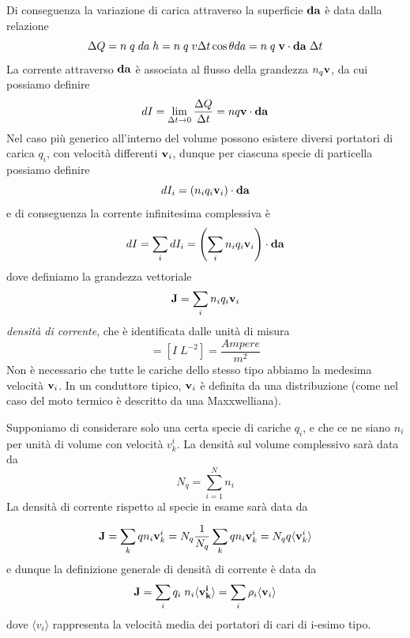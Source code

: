 Di conseguenza la variazione di carica attraverso la superficie $\bold{da}$ \`e data dalla relazione 
\begin{equation*}
	\Delta Q = n \;q\; da \; h = n\; q \;v \Delta t \cos \theta da = n \;q \; \bold{v} \cdot \bold{da} \; \Delta t 
\end{equation*}
La corrente attraverso $\bold{da}$ \`e associata al flusso della grandezza $n_q \bold{v}$, da cui possiamo definire 
\begin{equation*}
	dI = \lim_{\Delta t \to 0} \frac{\Delta Q}{\Delta t} = nq \bold{v} \cdot \bold{da} 
\end{equation*}
Nel caso pi\`u generico all'interno del volume possono esistere diversi portatori di carica $q_i$, con velocit\`a differenti $\bold{v}_i$, dunque per ciascuna specie di particella possiamo definire 
\begin{equation*}
	dI_i = (n_iq_i\bold{v}_i)\cdot \bold{da}
\end{equation*}
e di conseguenza la corrente infinitesima complessiva \`e 
\begin{equation*}
	dI = \sum_{i}dI_i = \left (\sum_{i}n_i q_i \bold{v}_i \right) \cdot \bold{da}
\end{equation*}
dove definiamo la grandezza vettoriale
\begin{equation*}
	\bold{J}= \sum_{i}n_i q_i \bold{v}_i 
\end{equation*}
\textit{densit\`a di corrente}, che \`e identificata dalle unit\`a di misura 
\begin{equation*}
	[\bold{J}] = [I \; L^{-2}] = \frac{Ampere}{m^2}
\end{equation*}
Non \`e necessario che tutte le cariche dello stesso tipo abbiamo la medesima velocit\`a $\bold{v}_i$. In un conduttore tipico, $\bold{v}_i$ \`e definita da una distribuzione (come nel caso del moto termico \`e descritto da una Maxxwelliana). 

Supponiamo di considerare solo una certa specie di cariche $q_i$, e che ce ne siano $n_i$ per unit\`a di volume con velocit\`a $v_k^i$. La densit\`a sul volume complessivo sar\`a data da 
\begin{equation*}
	N_q = \sum_{i=1}^Nn_i
\end{equation*}
La densit\`a di corrente rispetto al specie in esame sar\`a data da 

\begin{equation*}
	\bold{J} = \sum_{k}q n_i \bold{v}_k^i = N_q \frac{1}{N_q} \sum_k q n_i \bold{v}_{k}^i = N_q q \langle \bold{v}_{k}^i \rangle  
\end{equation*}
e dunque la definizione generale di densit\`a di corrente \`e data da 
\begin{equation*}
	\bold{J} = \sum_i q_i \; n_i\langle \bold{v_k^i} \rangle = \sum_i \rho_i \langle \bold{v}_i\rangle 
\end{equation*}
dove $\langle  v_i\rangle $ rappresenta la velocit\`a media dei portatori di cari di i-esimo tipo.
\newline

